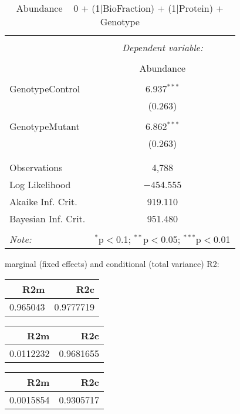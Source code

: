 \documentclass[11pt]{report}
\begin{document}
\begin{table}[!htbp] \centering 
  \caption{Abundance ~ 0 + (1|BioFraction) + (1|Protein) + Genotype} 
  \label{} 
\begin{tabular}{@{\extracolsep{5pt}}lc} 
\\[-1.8ex]\hline 
\hline \\[-1.8ex] 
 & \multicolumn{1}{c}{\textit{Dependent variable:}} \\ 
\cline{2-2} 
\\[-1.8ex] & Abundance \\ 
\hline \\[-1.8ex] 
 GenotypeControl & 6.937$^{***}$ \\ 
  & (0.263) \\ 
  & \\ 
 GenotypeMutant & 6.862$^{***}$ \\ 
  & (0.263) \\ 
  & \\ 
\hline \\[-1.8ex] 
Observations & 4,788 \\ 
Log Likelihood & $-$454.555 \\ 
Akaike Inf. Crit. & 919.110 \\ 
Bayesian Inf. Crit. & 951.480 \\ 
\hline 
\hline \\[-1.8ex] 
\textit{Note:}  & \multicolumn{1}{r}{$^{*}$p$<$0.1; $^{**}$p$<$0.05; $^{***}$p$<$0.01} \\ 
\end{tabular} 
\end{table} 
marginal (fixed effects) and conditional (total variance) R2:

\begin{tabular}{r|r}
\hline
R2m & R2c\\
\hline
0.965043 & 0.9777719\\
\hline
\end{tabular}

\begin{tabular}{r|r}
\hline
R2m & R2c\\
\hline
0.0112232 & 0.9681655\\
\hline
\end{tabular}

\begin{tabular}{r|r}
\hline
R2m & R2c\\
\hline
0.0015854 & 0.9305717\\
\hline
\end{tabular}
\end{document}
